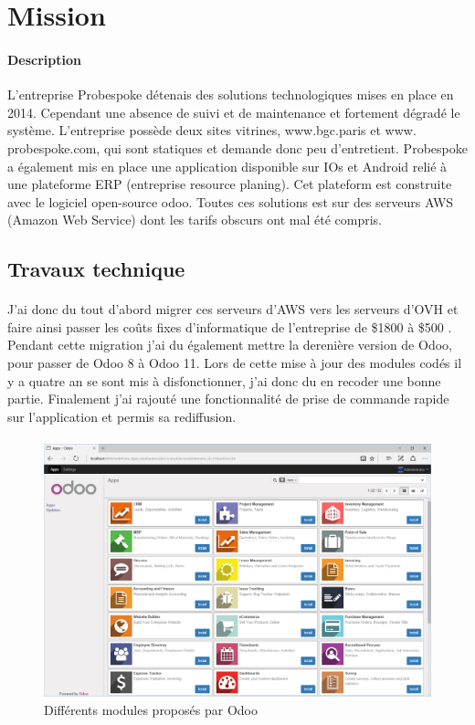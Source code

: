 \section{Mission}

\paragraph{Description}
L'entreprise Probespoke détenais des solutions technologiques mises en place en 2014.
Cependant une absence de suivi et de maintenance et fortement dégradé le système. L'entreprise possède deux sites vitrines, www.bgc.paris et www. probespoke.com, qui sont statiques et demande donc peu d'entretient.
Probespoke a également mis en place une application disponible sur IOs et Android relié à une plateforme ERP (entreprise resource planing). Cet plateform est construite avec le logiciel open-source odoo.
 Toutes ces solutions est sur des serveurs AWS (Amazon Web Service) dont les tarifs obscurs ont mal été compris.
\subsection{Travaux technique}
\paragraph{}
 J'ai donc du tout d'abord migrer ces serveurs d'AWS vers les serveurs d'OVH et faire ainsi passer les coûts fixes d'informatique de l'entreprise de \$1800 à \$500 .
 Pendant cette migration j'ai du également mettre la derenière version de Odoo, pour passer de Odoo 8 à Odoo 11.
 Lors de cette mise à jour des modules codés il y a quatre an se sont mis à disfonctionner, j'ai donc du en recoder une bonne partie. Finalement j'ai rajouté une fonctionnalité de prise de commande rapide sur l'application et permis sa rediffusion.
 \paragraph{}

 \begin{figure}[!h]
 \centering
 \includegraphics[width=12cm]{image/odoo.png}
 \caption{Différents modules proposés par Odoo}
 \end{figure}

